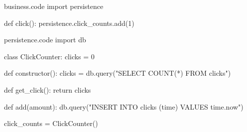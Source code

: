 \documentclass{slide}
\begin{document}
\begin{frame}[fragile]
\begin{code}[style=python]{business.code}
import persistence

def click():
    persistence.click_counts.add(1)
\end{code}
\end{frame}

\begin{frame}[fragile]
\small
\begin{code}[style=python,captionpos=t]{persistence.code}
import db

class ClickCounter:
    clicks = 0

    def constructor():
        clicks = db.query("SELECT COUNT(*) FROM clicks")

    def get_click():
        return clicks

    def add(amount):
        db.query("INSERT INTO clicks (time) VALUES {{time.now}}")

click_counts = ClickCounter()
\end{code}
\end{frame}


\end{document}
